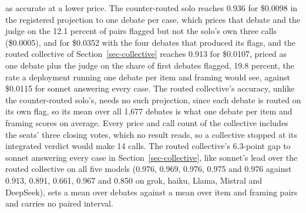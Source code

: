 as accurate at a lower price. The counter-routed solo reaches 0.936 for
\$0.0098 in the registered projection to one debate per case, which prices
that debate and the judge on the 12.1 percent of pairs flagged but not the
solo's own three calls (\$0.0005), and for \$0.0352 with the four debates
that produced its flags, and the routed collective of
Section~\ref{sec-collective} reaches 0.913 for \$0.0107, priced as one debate
plus the judge on the share of first debates flagged, 19.8 percent, the rate a
deployment running one debate per item and framing would see, against
\$0.0115 for sonnet answering every case. The routed collective's accuracy,
unlike the counter-routed solo's, needs no such projection, since each debate
is routed on its own flag, so its mean over all 1,677 debates is what one
debate per item and framing scores on average.
Every price and call count of the collective includes the seats' three
closing votes, which no result reads, so a collective stopped at its
integrated verdict would make 14 calls.
The routed collective's 6.3-point gap to sonnet answering every case in
Section~\ref{sec-collective}, like sonnet's lead over the routed
collective on all five models (0.976, 0.969, 0.976, 0.975 and 0.976 against
0.913, 0.891, 0.661, 0.967 and 0.850 on grok, haiku, Llama, Mistral and
DeepSeek), sets a mean over debates against a mean over item and framing
pairs and carries no paired interval.
